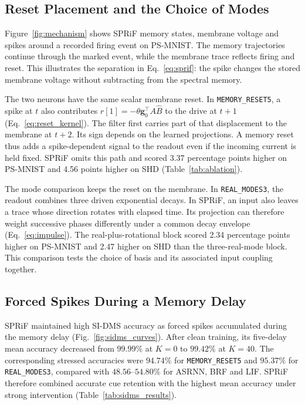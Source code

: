 \documentclass[letterpaper,journal]{IEEEtran}
\newcommand{\mr}{\textnormal{\texttt{MEMORY\_RESET5}}}
\newcommand{\rmodes}{\textnormal{\texttt{REAL\_MODES3}}}
\begin{document}
\subsection{Reset Placement and the Choice of Modes}

Figure~\ref{fig:mechanism} shows SPRiF memory states, membrane voltage and spikes around a recorded firing event on PS-MNIST. The memory trajectories continue through the marked event, while the membrane trace reflects firing and reset. This illustrates the separation in Eq.~\eqref{eq:sprif}: the spike changes the stored membrane voltage without subtracting from the spectral memory.

The two neurons have the same scalar membrane reset. In \mr{}, a spike at $t$ also contributes $r[1]=-\theta\mathbf g_0^\top A\widehat B$ to the drive at $t+1$ (Eq.~\eqref{eq:reset_kernel}). The filter first carries part of that displacement to the membrane at $t+2$. Its sign depends on the learned projections. A memory reset thus adds a spike-dependent signal to the readout even if the incoming current is held fixed. SPRiF omits this path and scored 3.37 percentage points higher on PS-MNIST and 4.56 points higher on SHD (Table~\ref{tab:ablation}).

The mode comparison keeps the reset on the membrane. In \rmodes{}, the readout combines three driven exponential decays. In SPRiF, an input also leaves a trace whose direction rotates with elapsed time. Its projection can therefore weight successive phases differently under a common decay envelope (Eq.~\eqref{eq:impulse}). The real-plus-rotational block scored 2.34 percentage points higher on PS-MNIST and 2.47 higher on SHD than the three-real-mode block. This comparison tests the choice of basis and its associated input coupling together.

\subsection{Forced Spikes During a Memory Delay}
\label{sec:sidms_results}

SPRiF maintained high SI-DMS accuracy as forced spikes accumulated during the memory delay (Fig.~\ref{fig:sidms_curves}). After clean training, its five-delay mean accuracy decreased from $99.99\%$ at $K=0$ to $99.42\%$ at $K=40$. The corresponding stressed accuracies were $94.74\%$ for \mr{} and $95.37\%$ for \rmodes{}, compared with $48.56$--$54.80\%$ for ASRNN, BRF and LIF. SPRiF therefore combined accurate cue retention with the highest mean accuracy under strong intervention (Table~\ref{tab:sidms_results}).
\end{document}
